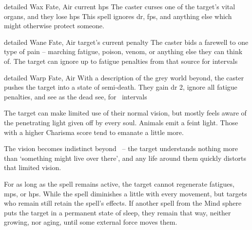 \ifodd\value{diceNo}
  {detailed}%
  {Wax}%
  {Fate, Air}%
  {current \glspl{hp}}%
  {The caster curses one of the target's vital organs, and they lose  \glspl{hp}}%
  {This spell ignores \gls{dr}, \glspl{fp}, and anything else which might otherwise protect someone.}

\else

  {detailed}%
  {Wane}%
  {Fate, Air}%
  {target's current  penalty}%
  {The caster bids a farewell to one type of pain -- marching fatigue, poison, venom, or anything else they can think of.
  The target can ignore up to  \gls{fatigue} penalties from that source for  \glspl{interval}}%
  {}

  {detailed}%
  {Warp}%
  {Fate, Air}%
  {}%
  {With a description of the grey world beyond, the caster pushes the target into a state of semi-death.
  They gain \gls{dr} 2, ignore all \gls{fatigue} penalties, and see as the dead see, for ~\glspl{interval}}%
  {
    The target can make limited use of their normal vision, but mostly feels aware of the penetrating light given off by every soul.
    Animals emit a feint light.
    Those with a higher Charisma score tend to emanate a little more.

    The vision becomes indistinct beyond \spellRange\ -- the target understands nothing more than `something might live over there', and any life around them quickly distorts that limited vision.

    For as long as the spell remains active, the target cannot regenerate \glspl{fatigue}, \glspl{mp}, or \glspl{hp}.
    While the spell diminishes a little with every movement, but targets who remain still retain the spell's effects.
    If another spell from the Mind sphere puts the target in a permanent state of sleep, they remain that way, neither growing, nor aging, until some external force moves them.
  }

\fi
{}
